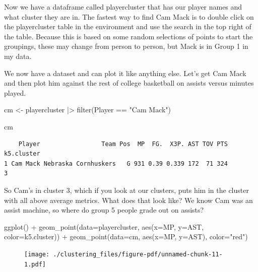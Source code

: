 \documentclass[
  letterpaper,
  DIV=11,
  numbers=noendperiod]{scrreprt}
\newenvironment{Shaded}{\begin{snugshade}}{\end{snugshade}}
\newcommand{\AttributeTok}[1]{\textcolor[rgb]{0.40,0.45,0.13}{#1}}
\newcommand{\FunctionTok}[1]{\textcolor[rgb]{0.28,0.35,0.67}{#1}}
\newcommand{\NormalTok}[1]{\textcolor[rgb]{0.00,0.23,0.31}{#1}}
\newcommand{\OtherTok}[1]{\textcolor[rgb]{0.00,0.23,0.31}{#1}}
\newcommand{\SpecialCharTok}[1]{\textcolor[rgb]{0.37,0.37,0.37}{#1}}
\newcommand{\StringTok}[1]{\textcolor[rgb]{0.13,0.47,0.30}{#1}}
\begin{document}
Now we have a dataframe called playercluster that has our player names
and what cluster they are in. The fastest way to find Cam Mack is to
double click on the playercluster table in the environment and use the
search in the top right of the table. Because this is based on some
random selections of points to start the groupings, these may change
from person to person, but Mack is in Group 1 in my data.

We now have a dataset and can plot it like anything else. Let's get Cam
Mack and then plot him against the rest of college basketball on assists
versus minutes played.

\begin{Shaded}
\begin{Highlighting}[]
\NormalTok{cm }\OtherTok{\textless{}{-}}\NormalTok{ playercluster }\SpecialCharTok{|\textgreater{}} \FunctionTok{filter}\NormalTok{(Player }\SpecialCharTok{==} \StringTok{"Cam Mack"}\NormalTok{)}

\NormalTok{cm}
\end{Highlighting}
\end{Shaded}

\begin{verbatim}
    Player                 Team Pos  MP  FG.  X3P. AST TOV PTS k5.cluster
1 Cam Mack Nebraska Cornhuskers   G 931 0.39 0.339 172  71 324          3
\end{verbatim}

So Cam's in cluster 3, which if you look at our clusters, puts him in
the cluster with all above average metrics. What does that look like? We
know Cam was an assist machine, so where do group 5 people grade out on
assists?

\begin{Shaded}
\begin{Highlighting}[]
\FunctionTok{ggplot}\NormalTok{() }\SpecialCharTok{+} 
  \FunctionTok{geom\_point}\NormalTok{(}\AttributeTok{data=}\NormalTok{playercluster, }\FunctionTok{aes}\NormalTok{(}\AttributeTok{x=}\NormalTok{MP, }\AttributeTok{y=}\NormalTok{AST, }\AttributeTok{color=}\NormalTok{k5.cluster)) }\SpecialCharTok{+} 
  \FunctionTok{geom\_point}\NormalTok{(}\AttributeTok{data=}\NormalTok{cm, }\FunctionTok{aes}\NormalTok{(}\AttributeTok{x=}\NormalTok{MP, }\AttributeTok{y=}\NormalTok{AST), }\AttributeTok{color=}\StringTok{"red"}\NormalTok{)}
\end{Highlighting}
\end{Shaded}

\begin{figure}[H]

{\centering \texttt{[image: ./clustering\_files/figure-pdf/unnamed-chunk-11-1.pdf]}

}

\end{figure}
\end{document}
